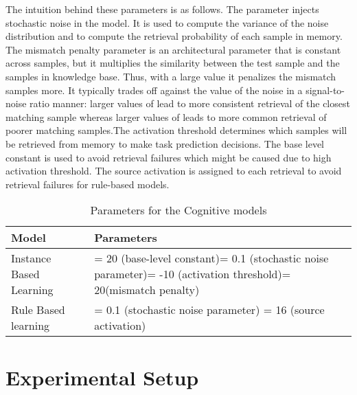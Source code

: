\documentclass[conference]{IEEEtran}
\begin{document}
The intuition behind these parameters is as follows. The parameter  injects stochastic noise in the model. It is used to compute the variance of the noise distribution and to compute the retrieval probability of each sample in memory. The mismatch penalty parameter  is an architectural parameter that is constant across samples, but it multiplies the similarity between the test sample and the samples in knowledge base.  Thus, with a large value it penalizes the mismatch samples more. It typically trades off against the value of the noise  in a signal-to-noise ratio manner: larger values of  lead to more consistent retrieval of the closest matching sample whereas larger values of  leads to more common retrieval of poorer matching samples.The activation threshold  determines which samples will be retrieved from memory to make task prediction decisions. The base level constant  is used to avoid retrieval failures which might be caused due to high activation threshold. The source activation  is assigned to each retrieval to avoid retrieval failures for rule-based models.
\vspace{-1em}
\begin{table}[h!]
	\caption{\textmd{Parameters for the Cognitive models}}
	\label{paramTable}
	\centering
	\renewcommand{\arraystretch}{1.5}
	
	\begin{tabular}{|p{2.2cm}|p{5cm}|} 
		\hline
		{\bf Model} &  {\bf Parameters} \\ \hline 
		Instance Based Learning &  = 20 (base-level constant)\newline  = 0.1 (stochastic noise parameter)\newline  = -10 (activation threshold)\newline  = 20(mismatch penalty) \\  \hline
		Rule Based learning &  = 0.1 (stochastic noise parameter) \newline  = 16 (source activation) \\ 
		
		\hline
	\end{tabular}
	\vspace{-1em}
	
\end{table}

\section{Experimental Setup}
\end{document}
